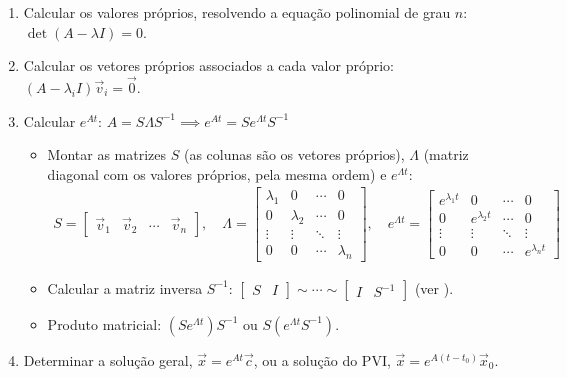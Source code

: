 \documentclass{article}
\begin{document}
\begin{enumerate}
    \item Calcular os valores próprios, resolvendo a equação polinomial de grau $n$: $\det(A - \lambda I) = 0$.
    \item Calcular os vetores próprios associados a cada valor próprio: $(A - \lambda_i I)\vec{v}_i = \vec{0}$.
    \item Calcular $e^{At}$:
    $\boxed{A = S \Lambda S^{-1} \implies e^{At} = S e^{\Lambda t} S^{-1}}$
    \begin{itemize}
        \item Montar as matrizes $S$ (as colunas são os vetores próprios), $\Lambda$ (matriz diagonal com
        os valores próprios, pela mesma ordem) e $e^{\Lambda t}$:
        \begin{gather*}
        S =
        \begin{bmatrix}
        \vec{v}_1 & \vec{v}_2 & \cdots & \vec{v}_n
        \end{bmatrix},
        \quad
        \Lambda =
        \begin{bmatrix}
        \lambda_1 & 0 & \cdots & 0 \\
        0 & \lambda_2 & \cdots & 0 \\
        \vdots & \vdots & \ddots & \vdots \\
        0 & 0 & \cdots & \lambda_n
        \end{bmatrix},
        \quad
        e^{\Lambda t} =
        \begin{bmatrix}
        e^{\lambda_1 t} & 0 & \cdots & 0 \\
        0 & e^{\lambda_2 t} & \cdots & 0 \\
        \vdots & \vdots & \ddots & \vdots \\
        0 & 0 & \cdots & e^{\lambda_n t}
        \end{bmatrix}
        \end{gather*}
        \item Calcular a matriz inversa $S^{-1}$:
        $\left[ \begin{array}{c|c} S & I \end{array} \right] \sim \cdots \sim
        \left[ \begin{array}{c|c} I & S^{-1} \end{array} \right]$
        (ver ).
        \item Produto matricial: $(S e^{\Lambda t})S^{-1}$ ou $S (e^{\Lambda t} S^{-1})$.
    \end{itemize}
    \item Determinar a solução geral, $\vec{x} = e^{At}\vec{c}$, ou a solução do PVI,
    $\vec{x} = e^{A(t - t_0)}\vec{x}_0$.
\end{enumerate}
\end{document}
